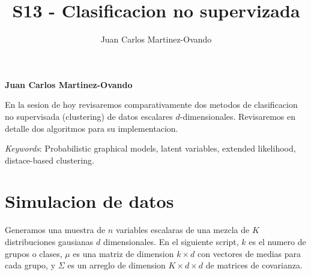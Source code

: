 \documentclass[11pt,]{article}
\title{S13 - Clasificacion no supervizada  }
\author{\Large Juan Carlos Martinez-Ovando\vspace{0.05in} \newline\normalsize\emph{}  }
\date{}
\newcommand*{\authorfont}{\fontfamily{phv}\selectfont}
\renewenvironment{abstract}
 {{%
    \setlength{\leftmargin}{0mm}
    \setlength{\rightmargin}{\leftmargin}%
  }%
  \relax}
 {\endlist}
\begin{document}
	
%

{%
\setlength{\parindent}{0pt}
\thispagestyle{plain}
{\fontsize{18}{20}\selectfont\raggedright 
\maketitle  %

}

{
   \vskip 13.5pt\relax \normalsize\fontsize{11}{12} 
\textbf{\authorfont Juan Carlos Martinez-Ovando} \hskip 15pt \emph{\small }   

}

}








\begin{abstract}

    \hbox{\vrule height .2pt width 39.14pc}

    \vskip 8.5pt %

\noindent En la sesion de hoy revisaremos comparativamente dos metodos de
clasificacion no supervisada (clustering) de datos escalares
\(d\)-dimensionales. Revisaremos en detalle dos algoritmos para su
implementacion.


\vskip 8.5pt \noindent \emph{Keywords}: Probabilistic graphical models, latent variables, extended likelihood,
distace-based clustering. \par

    \hbox{\vrule height .2pt width 39.14pc}



\end{abstract}


\vskip 6.5pt


\noindent \doublespacing \section{Simulacion de datos}\label{simulacion-de-datos}

Generamos una muestra de \(n\) variables escalaras de una mezcla de
\(K\) distribuciones gausianas \(d\) dimensionales. En el siguiente
script, \(k\) es el numero de grupos o clases, \(\mu\) es una matriz de
dimension \(k \times d\) con vectores de medias para cada grupo, y
\(\Sigma\) es un arreglo de dimension \(K \times d \times d\) de
matrices de covarianza.
\end{document}
